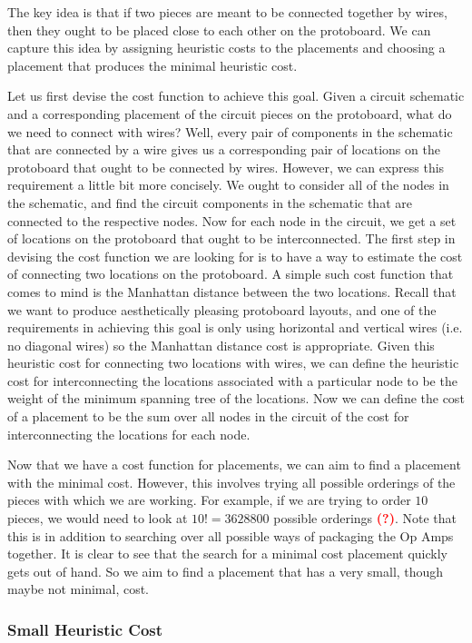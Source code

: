The key idea is that if two pieces are meant to be connected together by wires,
then they ought to be placed close to each other on the protoboard. We can
capture this idea by assigning heuristic costs to the placements and choosing
a placement that produces the minimal heuristic cost.

Let us first devise the cost function to achieve this goal. Given a circuit
schematic and a corresponding placement of the circuit pieces on the protoboard,
what do we need to connect with wires? Well, every pair of components in the
schematic that are connected by a wire gives us a corresponding pair of
locations on the protoboard that ought to be connected by wires. However, we can
express this requirement a little bit more concisely. We ought to consider all
of the nodes in the schematic, and find the circuit components in the schematic
that are connected to the respective nodes. Now for each node in the circuit, we
get a set of locations on the protoboard that ought to be interconnected. The
first step in devising the cost function we are looking for is to have a way to
estimate the cost of connecting two locations on the protoboard. A simple such
cost function that comes to mind is the Manhattan distance between the two
locations. Recall that we want to produce aesthetically pleasing protoboard
layouts, and one of the requirements in achieving this goal is only using
horizontal and vertical wires (i.e. no diagonal wires) so the Manhattan distance
cost is appropriate. Given this heuristic cost for connecting two locations with
wires, we can define the heuristic cost for interconnecting the locations
associated with a particular node to be the weight of the minimum spanning tree
of the locations. Now we can define the cost of a placement to be the sum over
all nodes in the circuit of the cost for interconnecting the locations for each
node.

Now that we have a cost function for placements, we can aim to find a
placement with the minimal cost. However, this involves trying all possible
orderings of the pieces with which we are working. For example, if we are trying
to order $10$ pieces, we would need to look at $10! = 3628800$ possible
orderings \textcolor{red}{\textbf{(?)}}. Note that this is in addition to
searching over all possible ways
of packaging the Op Amps together. It is clear to see that the search for a
minimal cost placement quickly gets out of hand. So we aim to find a placement
that has a very small, though maybe not minimal, cost.

\subsubsection{Small Heuristic Cost}

